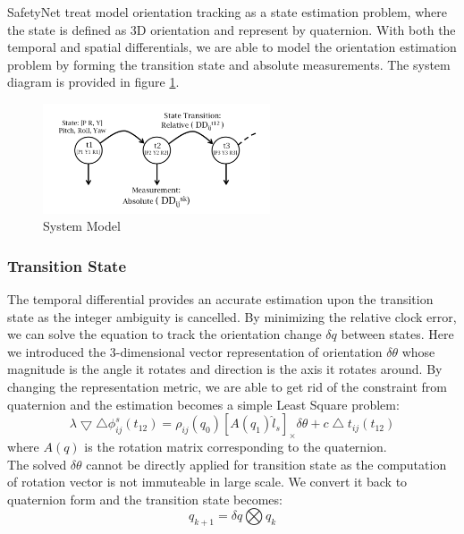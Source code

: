 \documentclass[journal,onecolumn]{IEEEtran}
\begin{document}
SafetyNet treat model orientation tracking as a state estimation problem, where the state is defined as 3D orientation and
represent by quaternion.
With both the temporal and spatial differentials, we are able to model the orientation
estimation problem by forming the transition state and absolute measurements.
The system diagram is provided in figure \ref{model}.\\
\begin{figure}
  \centering
  \captionsetup{justification=centering}
  \includegraphics[width=0.6\textwidth]{fig/model.png}
  \caption{System Model}
  \label{model}
\end{figure}
\subsubsection{Transition State}
The temporal differential provides an accurate estimation upon the transition state
as the integer ambiguity is cancelled. By minimizing the relative clock error, we
can solve the equation to track the orientation change $\delta q$ between states.
Here we introduced the 3-dimensional vector representation of orientation $\delta \theta$
whose magnitude is the angle it rotates and direction is the axis it rotates around.
By changing the representation metric, we are able to get rid of the constraint from
quaternion and the estimation becomes a simple Least Square problem:
\begin{equation}
  \lambda \bigtriangledown \bigtriangleup \phi_{ij}^{s}(t_{12})
  = \rho_{ij}(q_0)[A(q_1)\hat{l}_s]_{\times}\delta \theta + c\bigtriangleup t_{ij}(t_{12})
\end{equation}
where $A(q)$ is the rotation matrix corresponding to the quaternion.\\
The solved $\delta \theta$ cannot be directly applied for transition state as the
computation of rotation vector is not immuteable in large scale. We convert it back to
quaternion form and the transition state becomes:
\begin{equation}
  q_{k+1} = \delta q \bigotimes q_{k}
  \label{transition}
\end{equation}
\end{document}
